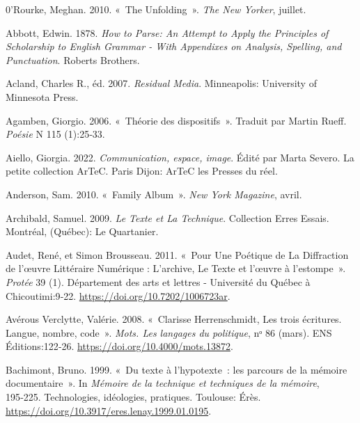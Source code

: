 
\hypertarget{refs}{}
\begin{CSLReferences}{1}{0}
\leavevmode{}%
0'Rourke, Meghan. 2010. {«~The {Unfolding}~»}. \emph{The New Yorker},
juillet.

\leavevmode{}%
Abbott, Edwin. 1878. \emph{{How to Parse: An Attempt to Apply the
Principles of Scholarship to English Grammar - With Appendixes on
Analysis, Spelling, and Punctuation}}. {Roberts Brothers}.

\leavevmode{}%
Acland, Charles R., éd. 2007. \emph{Residual {Media}}. {Minneapolis}:
{University of Minnesota Press}.

\leavevmode{}%
Agamben, Giorgio. 2006. {«~{Th{é}orie des dispositifs}~»}. Traduit par
Martin Rueff. \emph{Po{é}sie} N{\textdegree} 115 (1):25‑33.

\leavevmode{}%
Aiello, Giorgia. 2022. \emph{{Communication, espace, image}}. Édité par
Marta Severo. {La petite collection ArTeC}. {Paris Dijon}: {ArTeC les
Presses du r{é}el}.

\leavevmode{}%
Anderson, Sam. 2010. {«~Family {Album}~»}. \emph{New York Magazine},
avril.

\leavevmode{}%
Archibald, Samuel. 2009. \emph{Le {Texte} et La Technique}. Collection
Erres Essais. {Montr{é}al, (Qu{é}bec)}: {Le Quartanier}.

\leavevmode{}%
Audet, René, et Simon Brousseau. 2011. {«~Pour Une Po{é}tique de La
Diffraction de l'{œ}uvre Litt{é}raire Num{é}rique : {L}'archive, Le
Texte et l'{œ}uvre {à} l'estompe~»}. \emph{Prot{é}e} 39 (1).
{D{é}partement des arts et lettres - Universit{é} du Qu{é}bec {à}
Chicoutimi}:9‑22. \url{https://doi.org/10.7202/1006723ar}.

\leavevmode{}%
Avérous Verclytte, Valérie. 2008. {«~{Clarisse Herrenschmidt, Les trois
{é}critures. Langue, nombre, code}~»}. \emph{Mots. Les langages du
politique}, nᵒ 86 (mars). {ENS {É}ditions}:122‑26.
\url{https://doi.org/10.4000/mots.13872}.

\leavevmode{}%
Bachimont, Bruno. 1999. {«~{Du texte {à} l'hypotexte~: les parcours de
la m{é}moire documentaire}~»}. In \emph{{M{é}moire de la technique et
techniques de la m{é}moire}}, 195‑225. {Technologies, id{é}ologies,
pratiques}. {Toulouse}: {{É}r{è}s}.
\url{https://doi.org/10.3917/eres.lenay.1999.01.0195}.


\end{CSLReferences}

